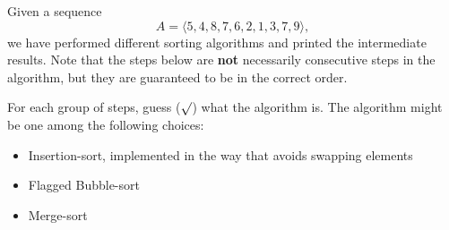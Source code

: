 
Given a sequence
\[A=\langle 5,4,8,7,6,2,1,3,7,9\rangle,\]
we have performed different sorting algorithms and printed the intermediate results. Note that the steps below are \textbf{not} necessarily consecutive steps in the algorithm, but they are guaranteed to be in the correct order.

For each group of steps, guess (\(\surd\)) what the algorithm is. The algorithm might be one among the following choices:
\begin{itemize}
  \item Insertion-sort, implemented in the way that avoids swapping elements
  \item Flagged Bubble-sort
  \item Merge-sort
\end{itemize}


